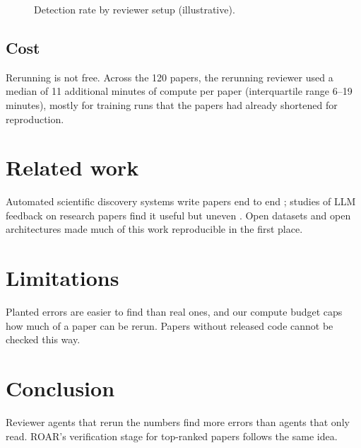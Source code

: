 \documentclass{roar2027}   %
\begin{document}
\begin{figure}[t]
  \centering
  \caption{Detection rate by reviewer setup (illustrative).}
  \label{fig:rate}
\end{figure}

\subsection{Cost}
\label{sec:cost}

Rerunning is not free. Across the 120 papers, the rerunning reviewer used a median of 11
additional minutes of compute per paper (interquartile range 6--19 minutes), mostly for
training runs that the papers had already shortened for reproduction.

\section{Related work}

Automated scientific discovery systems write papers end to end \citep{lu2024aiscientist};
studies of LLM feedback on research papers find it useful but uneven \citep{liang2024feedback}.
Open datasets \citep{schuhmann2022laion} and open architectures \citep{vaswani2017attention}
made much of this work reproducible in the first place.

\section{Limitations}

Planted errors are easier to find than real ones, and our compute budget caps how much of a
paper can be rerun. Papers without released code cannot be checked this way.

\section{Conclusion}

Reviewer agents that rerun the numbers find more errors than agents that only read. ROAR's
verification stage for top-ranked papers follows the same idea.


\end{document}
